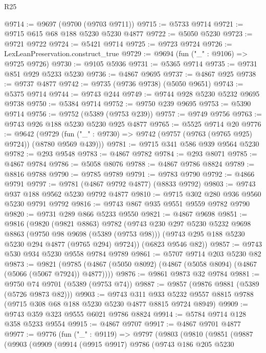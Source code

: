 \begin{lexlean}{R25}
\begin{coremodule}
@9714 := @9697 (@9700 (@9703 @9711))
@9715 := @5733 @9714
@9721 := @9715 @615 @68 @188 @5230 @5230 @4877
@9722 := @5050 @5230
@9723 := @9721 @9722
@9724 := @5421 @9714
@9725 := @9723 @9724
@9726 := LexLeanPreservation.construct_true
@9729 := @9694 (fun ("_" : @9106) => @9725 @9726)
@9730 := @9105 @5936
@9731 := @5365 @9714
@9735 := @9731 @851 @929 @5233 @5230
@9736 := @4867 @9695
@9737 := @4867 @925
@9738 := @9737 @4877
@9742 := @9735 (@9736 @9738) (@5050 @9651)
@9743 := @5375 @9714
@9744 := @9743 @244
@9749 := @9744 @928 @5230 @5232 @9695 @9738
@9750 := @5384 @9714
@9752 := @9750 @239 @9695
@9753 := @5390 @9714
@9756 := @9752 (@5389 (@9753 @239))
@9757 := @9749 @9756
@9763 := @9743 @926 @188 @5230 @5230 @925 @4877
@9765 := @5525 @9714 @20
@9776 := @9642
    (@9729 (fun ("_" : @9730) => @9742 (@9757 (@9763 (@9765 @925) @9724)) (@8780 @9569 @439)))
@9781 := @9715 @341 @586 @939 @9564 @5230
@9782 := @293 @9548
@9783 := @4867 @9782
@9784 := @293 @8071
@9785 := @4867 @9784
@9786 := @5058 @8076
@9788 := @4867 @9786 @8824
@9789 := @8816 @9788
@9790 := @9785 @9789
@9791 := @9783 @9790
@9792 := @4866 @9791
@9797 := @9781 (@4867 @9792 @4877) (@8833 @9792)
@9803 := @9743 @937 @188 @9562 @5230 @9792 @4877
@9810 := @9715 @302 @280 @936 @9560 @5230 @9791 @9792
@9816 := @9743 @867 @935 @9551 @9559 @9782 @9790
@9820 := @9731 @289 @866 @5233 @9550
@9821 := @4867 @9698
@9851 := @9816
    (@9820
      (@9821 @8863)
      @9782
      (@9743
        @230
        @297
        @5230
        @5232
        @9698
        @8863
        (@9750 @98 @9698 (@5389 (@9753 @98)))
        (@9743 @295 @188 @5230 @5230 @294 @4877 (@9765 @294) @9724))
      (@6823 @9546 @82))
@9857 := @9743 @530 @934 @5230 @9558 @9784 @9789
@9861 := @5707 @9714 @203 @5230 @82
@9873 := @9821
    (@9785 (@4867 (@5050 @8092) (@4867 (@5058 @8094) (@4867 (@5066 (@5067 @7924)) @4877))))
@9876 := @9861 @9873 @32 @9784
@9881 := @9750 @74 @9701 (@5389 (@9753 @74))
@9887 := @9857 (@9876 @9881 (@5389 (@5726 @9873 @82)))
@9903 := @9743
    @311
    @933
    @5232
    @9557
    @8815
    @9788
    (@9715 @308 @68 @188 @5230 @5230 @4877 @8815 @9724 @8949)
@9909 := @9743 @359 @323 @9555 @6021 @9786 @8824
@9914 := @5784 @9714 @128 @358 @5233 @9554
@9915 := @4867 @9707
@9917 := @4867 @9701 @4877
@9977 := @9776
    (fun ("_" : @9119) =>
    @9797
      (@9803
        (@9810
          (@9851
            (@9887
              (@9903
                (@9909
                  (@9914
                    (@9915 @9917)
                    @9786
                    (@9743
                      @186
                      @205
                      @5230

\end{coremodule}
\end{lexlean}
